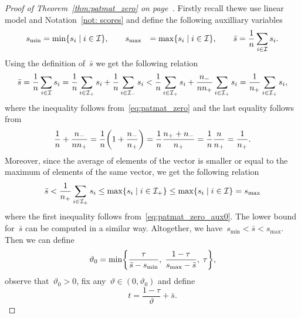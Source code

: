 \patmatzero*
\begin{proof}[Proof of Theorem~\ref{thm:patmat_zero} on page~\pageref{thm:patmat_zero}]
  Firstly recall thewe use linear model and Notation~\ref{not: scores} and define the following auxilliary variables
  \begin{equation*}
    \begin{aligned}
      s_{\min} & = \min \Set{s_i}{i \in \I}, \qquad
      s_{\max} & = \max \Set{s_i}{i \in \I}, \qquad
      \bar{s} & = \frac{1}{n} \sum_{i \in \I} s_i. \\
    \end{aligned}
  \end{equation*}
  Using the definition of~$\bar{s}$ we get the following relation
  \begin{equation}\label{eq:patmat_zero_aux0}
    \bar{s}
      = \frac{1}{n} \sum_{i \in \mathcal{I}} s_i
      = \frac{1}{n}\sum_{i \in \mathcal{I}_{+}} s_i + \frac{1}{n} \sum_{i \in \mathcal{I}_{-}} s_i
      < \frac{1}{n} \sum_{i \in \mathcal{I}_{+}} s_i + \frac{n_{-}}{nn_{+}} \sum_{i \in \mathcal{I}_{+}} s_i
      = \frac{1}{n_{+}} \sum_{i \in \mathcal{I}_{+}} s_i,
  \end{equation}
  where the inequality follows from~\eqref{eq:patmat_zero} and the last equality follows from
  \begin{equation*}
    \frac{1}{n} + \frac{\nneg}{n\npos}
      = \frac{1}{n} \Brac{1 + \frac{\nneg}{\npos}} 
      = \frac{1}{n} \frac{\npos + \nneg}{\npos}
      = \frac{1}{n} \frac{n}{\npos}
      = \frac{1}{\npos}.
  \end{equation*}
  Moreover, since the average of elements of the  vector is smaller or equal to the maximum of elements of the same vector, we get the following relation
  \begin{equation*}
    \bar{s}
      < \frac{1}{\npos} \sum_{i \in \Ipos} s_i
      \le \max \Set{s_i}{i \in \Ipos}
      \le \max \Set{s_i}{i \in \I}
      = s_{\max}
  \end{equation*}
  where the first inequality follows from~\eqref{eq:patmat_zero_aux0}. The lower bound for~$\bar{s}$ can be computed in a similar way. Altogether, we have~$s_{\min} < \bar{s} < s_{\max}$. Then we can define
  \begin{equation*}
    \vartheta_0 = \min\Brac[c]{\frac{\tau}{\bar{s} - s_{\min}}, \; \frac{1-\tau}{s_{\max}-\bar{s}}, \; \tau},
  \end{equation*}
  observe that~$\vartheta_0 > 0$, fix any~$\vartheta \in (0, \vartheta_0)$ and define
  \begin{equation*}
    t = \frac{1 - \tau}{\vartheta} + \bar{s}.

\end{equation*}
\end{proof}
